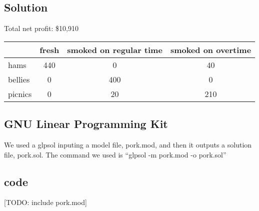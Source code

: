\documentclass[a4paper,10pt]{article}
\begin{document}
	\subsection{Solution}
	Total net profit: \$10,910\\
	\begin{tabular}{lccc}
\hline
	& fresh & smoked on regular time & smoked on overtime\\
\hline
	hams & 440 & 0 & 40\\
	bellies & 0 & 400 & 0\\
	picnics & 0 & 20 & 210
	\end{tabular}

	\subsection{GNU Linear Programming Kit}
	      We used a glpsol inputing a model file, pork.mod, and then it outputs a solution file, pork.sol.  The command we used is ``glpsol -m pork.mod -o pork.sol''

	\subsection{code}
	      [TODO: include pork.mod]
		
\end{document}
